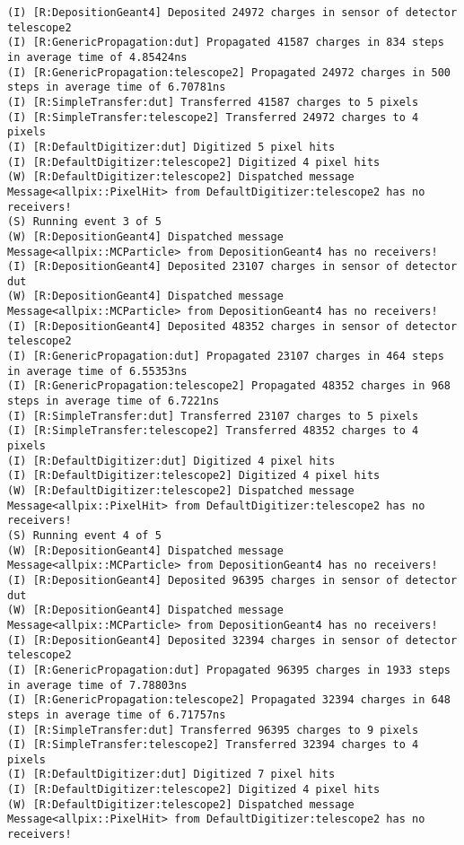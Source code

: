 \begin{lstlisting}[breaklines]
(I) [R:DepositionGeant4] Deposited 24972 charges in sensor of detector telescope2
(I) [R:GenericPropagation:dut] Propagated 41587 charges in 834 steps in average time of 4.85424ns
(I) [R:GenericPropagation:telescope2] Propagated 24972 charges in 500 steps in average time of 6.70781ns
(I) [R:SimpleTransfer:dut] Transferred 41587 charges to 5 pixels
(I) [R:SimpleTransfer:telescope2] Transferred 24972 charges to 4 pixels
(I) [R:DefaultDigitizer:dut] Digitized 5 pixel hits
(I) [R:DefaultDigitizer:telescope2] Digitized 4 pixel hits
(W) [R:DefaultDigitizer:telescope2] Dispatched message Message<allpix::PixelHit> from DefaultDigitizer:telescope2 has no receivers!
(S) Running event 3 of 5
(W) [R:DepositionGeant4] Dispatched message Message<allpix::MCParticle> from DepositionGeant4 has no receivers!
(I) [R:DepositionGeant4] Deposited 23107 charges in sensor of detector dut
(W) [R:DepositionGeant4] Dispatched message Message<allpix::MCParticle> from DepositionGeant4 has no receivers!
(I) [R:DepositionGeant4] Deposited 48352 charges in sensor of detector telescope2
(I) [R:GenericPropagation:dut] Propagated 23107 charges in 464 steps in average time of 6.55353ns
(I) [R:GenericPropagation:telescope2] Propagated 48352 charges in 968 steps in average time of 6.7221ns
(I) [R:SimpleTransfer:dut] Transferred 23107 charges to 5 pixels
(I) [R:SimpleTransfer:telescope2] Transferred 48352 charges to 4 pixels
(I) [R:DefaultDigitizer:dut] Digitized 4 pixel hits
(I) [R:DefaultDigitizer:telescope2] Digitized 4 pixel hits
(W) [R:DefaultDigitizer:telescope2] Dispatched message Message<allpix::PixelHit> from DefaultDigitizer:telescope2 has no receivers!
(S) Running event 4 of 5
(W) [R:DepositionGeant4] Dispatched message Message<allpix::MCParticle> from DepositionGeant4 has no receivers!
(I) [R:DepositionGeant4] Deposited 96395 charges in sensor of detector dut
(W) [R:DepositionGeant4] Dispatched message Message<allpix::MCParticle> from DepositionGeant4 has no receivers!
(I) [R:DepositionGeant4] Deposited 32394 charges in sensor of detector telescope2
(I) [R:GenericPropagation:dut] Propagated 96395 charges in 1933 steps in average time of 7.78803ns
(I) [R:GenericPropagation:telescope2] Propagated 32394 charges in 648 steps in average time of 6.71757ns
(I) [R:SimpleTransfer:dut] Transferred 96395 charges to 9 pixels
(I) [R:SimpleTransfer:telescope2] Transferred 32394 charges to 4 pixels
(I) [R:DefaultDigitizer:dut] Digitized 7 pixel hits
(I) [R:DefaultDigitizer:telescope2] Digitized 4 pixel hits
(W) [R:DefaultDigitizer:telescope2] Dispatched message Message<allpix::PixelHit> from DefaultDigitizer:telescope2 has no receivers!

\end{lstlisting}
